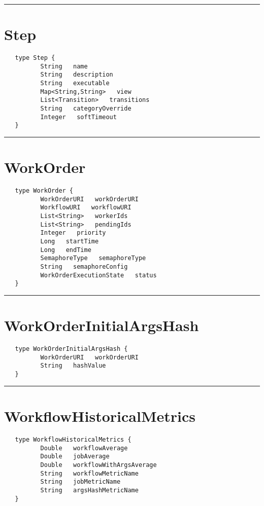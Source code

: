 \rule{15cm}{2pt}
\section{Step}
\label{type:Step}

\begin{verbatim}
   type Step {
          String   name
          String   description
          String   executable
          Map<String,String>   view
          List<Transition>   transitions
          String   categoryOverride
          Integer   softTimeout
   }
\end{verbatim}

\rule{15cm}{2pt}
\section{WorkOrder}
\label{type:WorkOrder}

\begin{verbatim}
   type WorkOrder {
          WorkOrderURI   workOrderURI
          WorkflowURI   workflowURI
          List<String>   workerIds
          List<String>   pendingIds
          Integer   priority
          Long   startTime
          Long   endTime
          SemaphoreType   semaphoreType
          String   semaphoreConfig
          WorkOrderExecutionState   status
   }
\end{verbatim}

\rule{15cm}{2pt}
\section{WorkOrderInitialArgsHash}
\label{type:WorkOrderInitialArgsHash}

\begin{verbatim}
   type WorkOrderInitialArgsHash {
          WorkOrderURI   workOrderURI
          String   hashValue
   }
\end{verbatim}

\rule{15cm}{2pt}
\section{WorkflowHistoricalMetrics}
\label{type:WorkflowHistoricalMetrics}

\begin{verbatim}
   type WorkflowHistoricalMetrics {
          Double   workflowAverage
          Double   jobAverage
          Double   workflowWithArgsAverage
          String   workflowMetricName
          String   jobMetricName
          String   argsHashMetricName
   }
\end{verbatim}

